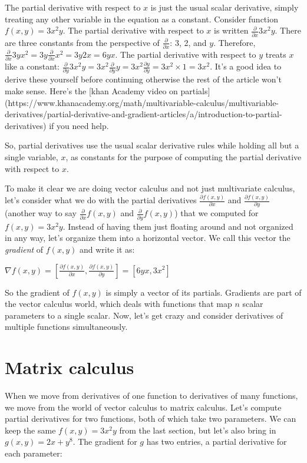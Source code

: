 \documentclass[11pt]{article}
\begin{document}
The partial derivative with respect to $x$ is just the usual scalar derivative, simply treating any other variable in the equation as a constant.  Consider function $f(x,y) = 3x^2y$. The partial derivative with respect to $x$ is written $\frac{\partial}{\partial x} 3x^2y$. There are three constants from the perspective of $\frac{\partial}{\partial x}$: 3, 2, and $y$. Therefore, $\frac{\partial}{\partial x} 3yx^2 = 3y\frac{\partial}{\partial x} x^2 = 3y2x = 6yx$. The partial derivative with respect to $y$ treats $x$ like a constant: $\frac{\partial}{\partial y} 3x^2y = 3x^2\frac{\partial}{\partial y} y = 3x^2\frac{\partial y}{\partial y} = 3x^2 \times 1 = 3x^2$.  It's a good idea to derive these yourself before continuing otherwise the rest of the article won't make sense.  Here's the [khan Academy video on partials](https://www.khanacademy.org/math/multivariable-calculus/multivariable-derivatives/partial-derivative-and-gradient-articles/a/introduction-to-partial-derivatives) if you need help.

So, partial derivatives use the usual scalar derivative rules while holding all but a single variable, $x$, as constants for the purpose of computing the partial derivative with respect to $x$.

To make it clear we are doing vector calculus and not just multivariate calculus, let's consider what we do with the partial derivatives $\frac{\partial f(x,y)}{\partial x}$ and $\frac{\partial f(x,y)}{\partial y}$ (another way to say $\frac{\partial}{\partial x}f(x,y)$ and $\frac{\partial }{\partial y}f(x,y)$) that we computed for $f(x,y) = 3x^2y$.  Instead of having them just floating around and not organized in any way, let's organize them into a horizontal vector. We call this vector the {\em gradient} of $f(x,y)$ and write it as:

$\nabla f(x,y)  = [ \frac{\partial f(x,y)}{\partial x}, \frac{\partial f(x,y)}{\partial y}] = [6yx, 3x^2]$

So the gradient of $f(x,y)$ is simply a vector of its partials. Gradients are part of the vector calculus world, which deals with functions that map $n$ scalar parameters to a single scalar.  Now, let's get crazy and consider derivatives of multiple functions simultaneously.

\section{Matrix calculus}

When we move from derivatives of one function to derivatives of many functions, we move from the world of vector calculus to matrix calculus. Let's compute partial derivatives for two functions, both of which take two parameters.  We can keep the same $f(x,y) = 3x^2y$ from the last section, but let's also bring in $g(x,y) = 2x + y^8$.  The gradient for $g$ has two entries, a partial derivative for each parameter:
\end{document}

